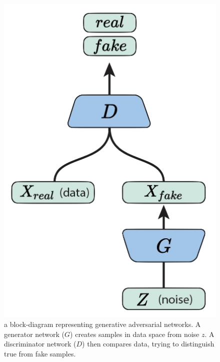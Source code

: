 \begin{figure}
	\begin{center}
		\includegraphics[scale=0.25]{./plots/GAN_model.png}
	\end{center}
	\caption{a block-diagram representing generative adversarial networks. A generator network ($G$) creates samples in data space from noise $z$. A discriminator network ($D$) then compares data, trying to distinguish true from fake samples.}
	\label{fig:game}
\end{figure}

